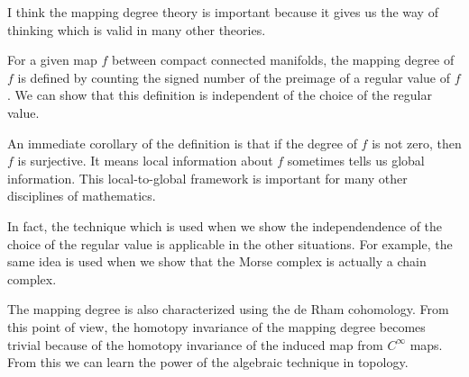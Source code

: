 \documentclass[dvipdfmx,uplatex]{article}
\begin{document}
I think the mapping degree theory is important because it gives us the way of thinking which is valid 
in many other theories. 

For a given map $f$ between compact connected manifolds, 
the mapping degree of $f$ is defined by counting the signed number of the preimage of a regular value of
$f$. We can show that this definition is independent of the choice of the regular value. 

An immediate corollary of the definition is that if the degree of $f$ is not zero, then $f$ is surjective. 
It means local information about $f$ sometimes tells us global information. This local-to-global
framework is important for many other disciplines of mathematics. 

In fact, the technique which is used when we show the independendence of the choice of the regular value
is applicable in the other situations. For example, the same idea is used when we show that the Morse
complex is actually a chain complex. 

The mapping degree is also characterized using the de Rham cohomology. From this point of view, the homotopy 
invariance of the mapping degree becomes trivial because of the homotopy invariance of the induced map 
from $C^\infty$ maps. From this we can learn the power of the algebraic technique in topology. 
\end{document}

